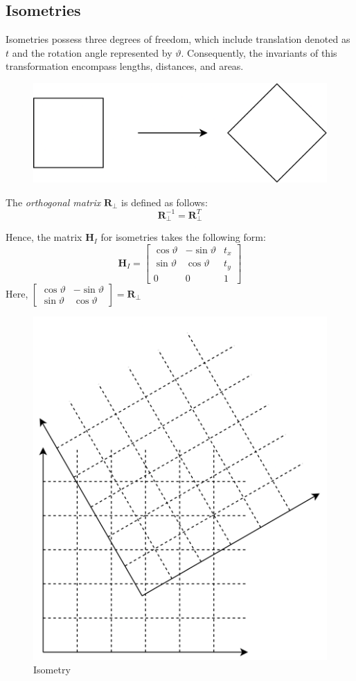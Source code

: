 \subsection{Isometries}
Isometries possess three degrees of freedom, which include translation denoted as $t$ and the rotation angle represented by $\vartheta$. 
Consequently, the invariants of this transformation encompass lengths, distances, and areas.
\begin{figure}[H]
    \centering
    \includegraphics[width=0.25\linewidth]{images/isometry.png}
\end{figure}
\begin{definition}
    The \emph{orthogonal matrix} $\mathbf{R}_{\perp}$ is defined as follows: 
    \[\mathbf{R}_{\perp}^{-1}=\mathbf{R}_{\perp}^{T}\]
\end{definition}
Hence, the matrix $\mathbf{H}_I$ for isometries takes the following form:
\[\mathbf{H}_I=
\begin{bmatrix}
    \cos \vartheta & -\sin \vartheta & t_x \\
    \sin \vartheta & \cos \vartheta & t_y \\
    0 & 0 & 1
\end{bmatrix}\]
Here, $
\begin{bmatrix}
    \cos \vartheta & -\sin \vartheta \\
    \sin \vartheta & \cos \vartheta
\end{bmatrix}
=\mathbf{R}_{\perp}$
\begin{figure}[H]
    \centering
    \includegraphics[width=0.25\linewidth]{images/isometry1.png}
    \caption{Isometry}
\end{figure}

